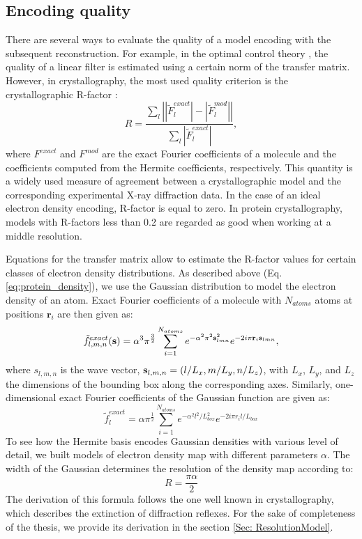 \subsection{Encoding quality}
There are several ways to evaluate the quality of a model encoding with the subsequent reconstruction. 
For example, in the optimal control theory \cite{boyd1991linear}, the quality of a linear filter is estimated using a certain norm of the transfer matrix.
However, in crystallography, the most used quality criterion is the crystallographic R-factor \cite{stout1968x}:
\begin{equation}
R = \frac{ \sum_{l}\left|\left|\tilde{F}_{l}^{exact} \right| - \left|\tilde{F}_{l}^{mod} \right| \right|}{\sum_{l}\left|\tilde{F}_{l}^{exact} \right|}
,\label{eq:Rfactor}
\end{equation}
where $F^{exact}$ and $F^{mod}$ are the exact Fourier coefficients of a molecule and the coefficients computed from the Hermite coefficients, respectively.
This quantity is a widely used measure of agreement between a crystallographic model and the corresponding experimental X-ray diffraction data. In the case of an ideal electron density
encoding, R-factor is equal to zero. In protein crystallography, models with R-factors less than 0.2 are regarded as good when working at a middle resolution.

%
Equations for the transfer matrix allow to estimate the R-factor values for certain classes of electron density distributions. 
As described above (Eq. \ref{eq:protein_density}), we use the Gaussian distribution to model the electron density of an atom. 
%
Exact Fourier coefficients of a molecule with $N_{atoms}$ atoms at positions $\mathbf{r}_{i}$ are then given as: 
\begin{equation}
{\tilde f}_{l,m,n}^{exact}({\bf s})= \alpha^3 \pi^\frac{3}{2} \sum_{i=1}^{N_{atoms}} e^{ - \alpha^2 \pi^2 {\bf s}_{lmn}^2  } e^ { -2 i \pi \mathbf{r}_{i} {\bf s}_{lmn} }
,\label{eq:ExactCoef}
\end{equation}
where $s_{l,m,n}$ is the wave vector,  ${\bf s}_{l,m,n}=\left( l/L_x,m/L_y,n/L_z \right)$, with $L_x$, $L_y$,  and $L_z$ the dimensions of the bounding box along the corresponding axes.
Similarly, one-dimensional exact Fourier coefficients of the Gaussian function are given as:
\begin{equation}
{\tilde f}_{l}^{exact} =\alpha \pi^\frac{1}{2} \sum_{i=1}^{N_{atoms}} e^{ - \alpha^2 l^2 / L_{box}^2 } e^ { -2 i \pi {r}_{i} l /  L_{box}}
\label{eq:ExactCoef1D}
\end{equation}
To see how the Hermite basis encodes Gaussian densities with various level of detail, we built models of electron density map with different parameters $\alpha$. The 
width of the Gaussian determines the resolution of the density map according to:
\begin{equation}
R=\frac{\pi\alpha}{2}
\label{eq: densityModelAlphaVsResolution}
\end{equation}
The derivation of this formula follows the one well known in crystallography, which describes the extinction of diffraction reflexes. For the sake of completeness of the thesis, we provide 
its derivation in the section \ref{Sec: ResolutionModel}.

